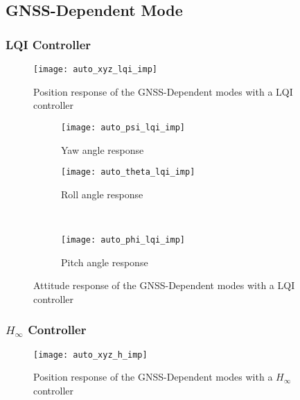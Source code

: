 \subsection{GNSS-Dependent Mode}

\subsubsection{LQI Controller}

\begin{figure}[h]
	\begin{center}
	\texttt{[image: auto\_xyz\_lqi\_imp]}
	\caption{Position response of the GNSS-Dependent modes with a LQI controller}
	\label{fig:auto_xyz_lqi_imp}
	\end{center}
	\end{figure}
	
\begin{figure}[H]
\begin{subfigure}{.5\linewidth}
\centering
\texttt{[image: auto\_psi\_lqi\_imp]}
\caption{Yaw angle response}
\label{fig:auto_psi_lqi_imp}
\end{subfigure}%
\begin{subfigure}{.5\linewidth}
\centering
\texttt{[image: auto\_theta\_lqi\_imp]}
\caption{Roll angle response}
\label{fig:auto_theta_lqi_imp}
\end{subfigure}\\[1ex]
\begin{subfigure}{\linewidth}
\centering
\texttt{[image: auto\_phi\_lqi\_imp]}
\caption{Pitch angle response}
\label{fig:auto_psi_lqi_imp}
\end{subfigure}
\caption{Attitude response of the GNSS-Dependent modes with a LQI controller}
\label{fig:auto_lqi_imp}
\end{figure}


\subsubsection{$H_\infty$ Controller}

\begin{figure}[h]
	\begin{center}
	\texttt{[image: auto\_xyz\_h\_imp]}
	\caption{Position response of the GNSS-Dependent modes with a $H_\infty$ controller}
	\label{fig:auto_xyz_h_imp}
	\end{center}
	\end{figure}
	
